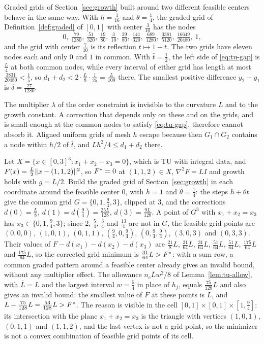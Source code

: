 Graded grids of Section~\ref{sec:growth} built around two different feasible
centers behave in the same way. With $h=\frac1{16}$ and $\theta=\frac14$, the
graded grid of Definition~\ref{def:graded} of $[0,1]$ with center
$\frac3{10}$ has the nodes
\[
0,\ \tfrac{79}{1280},\ \tfrac{51}{320},\ \tfrac{19}{80},\ \tfrac3{10},\
\tfrac{29}{80},\ \tfrac{141}{320},\ \tfrac{689}{1280},\ \tfrac{3381}{5120},\
\tfrac{16649}{20480},\ 1,
\]
and the grid with center $\frac7{10}$ is its reflection $t\mapsto1-t$. The
two grids have eleven nodes each and only $0$ and $1$ in common. With
$\bar t=\frac12$, the left side of \eqref{eq:tu-gap} is $\frac L4$ at both
common nodes, while every interval of either grid has length at most
$\frac{3831}{20480}<\frac15$, so
$d_1+d_2<2\cdot\frac L8\cdot\frac1{25}=\frac L{100}$ there. The smallest
positive difference $y_2-y_1$ is $\delta=\frac{27}{1280}$.

The multiplier $\lambda$ of the order constraint is invisible to the
curvature $L$ and to the growth constant. A correction that depends only on
these and on the grids, and is small enough at the common nodes to satisfy
\eqref{eq:tu-gap}, therefore cannot absorb it. Aligned uniform grids of mesh
$h$ escape because then $G_1\cap G_2$ contains a node within $h/2$ of $\bar t$, and
$Lh^2/4\le d_1+d_2$ there.

\begin{example}\label{ex:tu-sum}
Let $X=\{x\in[0,3]^3:x_1+x_2-x_3=0\}$, which is TU with integral data, and
$F(x)=\frac L2\lVert x-(1,1,2)\rVert^2$, so $F^{*}=0$ at $(1,1,2)\in X$,
$\nabla^2F=LI$ and growth holds with $g=L/2$. Build the graded grid of
Section~\ref{sec:growth} in each coordinate around the feasible center $0$,
with $h=1$ and $\theta=\frac14$: the steps $h+\theta t$ give the common grid
$G=\{0,1,\frac94,3\}$, clipped at $3$, and the corrections
$d(0)=\frac L8$, $d(1)=d(\frac94)=\frac{25L}{128}$, $d(3)=\frac{9L}{128}$.
A point of $G^3$ with $x_1+x_2=x_3$ has $x_3\in\{0,1,\frac94,3\}$; since
$2$, $\frac54$, $\frac34$ and $\frac{13}4$ are not in $G$, the feasible grid
points are $(0,0,0)$, $(1,0,1)$, $(0,1,1)$, $(\frac94,0,\frac94)$,
$(0,\frac94,\frac94)$, $(3,0,3)$ and $(0,3,3)$. Their values of
$F-d(x_1)-d(x_2)-d(x_3)$ are $\frac{21}8L$, $\frac{31}{64}L$,
$\frac{31}{64}L$, $\frac{51}{64}L$, $\frac{51}{64}L$, $\frac{175}{64}L$ and
$\frac{175}{64}L$, so the corrected grid minimum is $\frac{31}{64}L>F^{*}$:
with a sum row, a common graded pattern around a feasible center already
gives an invalid bound, without any multiplier effect. The allowance
$n_c\bar Lw^2/8$ of Lemma~\ref{lem:tu-allow}, with $\bar L=L$ and the largest
interval $w=\frac54$ in place of $h_j$, equals $\frac{75}{128}L$ and also
gives an invalid bound: the smallest value of $F$ at these points is $L$, and
$L-\frac{75}{128}L=\frac{53}{128}L>F^{*}$. The reason is visible in the cell
$[0,1]\times[0,1]\times[1,\frac94]$: its intersection with the plane
$x_1+x_2=x_3$ is the triangle with vertices $(1,0,1)$, $(0,1,1)$ and
$(1,1,2)$, and the last vertex is not a grid point, so the minimizer is not a
convex combination of feasible grid points of its cell.
\end{example}
